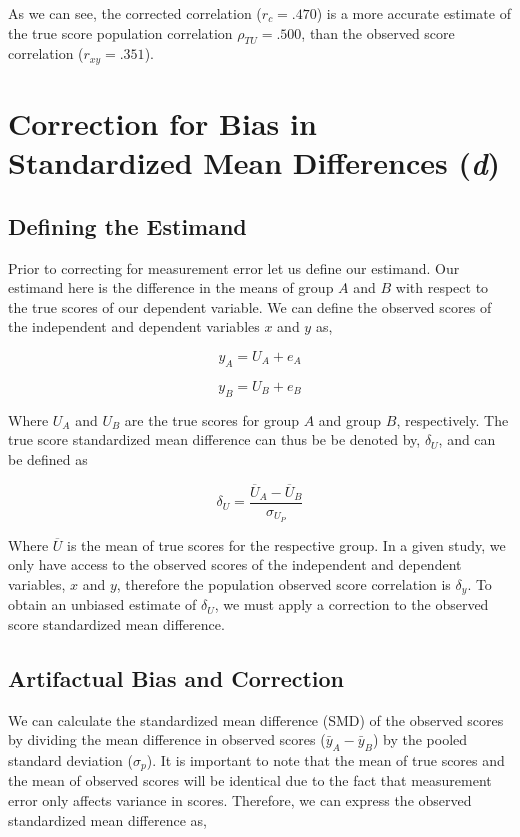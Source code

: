 \documentclass[
  letterpaper,
  DIV=11,
  numbers=noendperiod]{scrreprt}
\begin{document}
As we can see, the corrected correlation (\(r_c = .470\)) is a more
accurate estimate of the true score population correlation
\(\rho_{TU} = .500\), than the observed score correlation
(\(r_{xy}=.351\)).

\hypertarget{correction-for-bias-in-standardized-mean-differences-d}{%
\section{\texorpdfstring{Correction for Bias in Standardized Mean
Differences
(\emph{d})}{Correction for Bias in Standardized Mean Differences (d)}}\label{correction-for-bias-in-standardized-mean-differences-d}}

\hypertarget{defining-the-estimand-1}{%
\subsection{Defining the Estimand}\label{defining-the-estimand-1}}

Prior to correcting for measurement error let us define our estimand.
Our estimand here is the difference in the means of group \(A\) and
\(B\) with respect to the true scores of our dependent variable. We can
define the observed scores of the independent and dependent variables
\(x\) and \(y\) as,

\[
y_A = U_A + e_A
\]

\[
y_B = U_B + e_B
\]

Where \(U_A\) and \(U_B\) are the true scores for group \(A\) and group
\(B\), respectively. The true score standardized mean difference can
thus be be denoted by, \(\delta_{U}\), and can be defined as

\[
\delta_{U} = \frac{\overline{U}_A - \overline{U}_B}{\sigma_{U_P}}
\]

Where \(\overline{U}\) is the mean of true scores for the respective
group. In a given study, we only have access to the observed scores of
the independent and dependent variables, \(x\) and \(y\), therefore the
population observed score correlation is \(\delta_{y}\). To obtain an
unbiased estimate of \(\delta_{U}\), we must apply a correction to the
observed score standardized mean difference.

\hypertarget{sec-d-SMD}{%
\subsection{Artifactual Bias and Correction}\label{sec-d-SMD}}

We can calculate the standardized mean difference (SMD) of the observed
scores by dividing the mean difference in observed scores
(\(\bar{y}_A-\bar{y}_B\)) by the pooled standard deviation
(\(\sigma_p\)). It is important to note that the mean of true scores and
the mean of observed scores will be identical due to the fact that
measurement error only affects variance in scores. Therefore, we can
express the observed standardized mean difference as,
\end{document}
